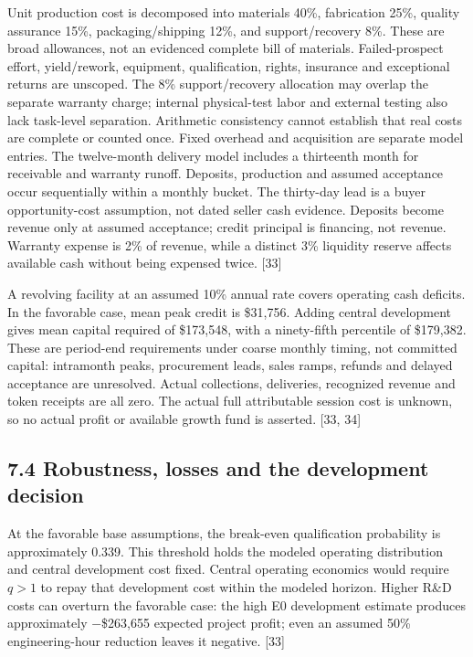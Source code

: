 \documentclass[
  11pt,
]{article}
\begin{document}
Unit production cost is decomposed into materials 40\%, fabrication
25\%, quality assurance 15\%, packaging/shipping 12\%, and
support/recovery 8\%. These are broad allowances, not an evidenced
complete bill of materials. Failed-prospect effort, yield/rework,
equipment, qualification, rights, insurance and exceptional returns are
unscoped. The 8\% support/recovery allocation may overlap the separate
warranty charge; internal physical-test labor and external testing also
lack task-level separation. Arithmetic consistency cannot establish that
real costs are complete or counted once. Fixed overhead and acquisition
are separate model entries. The twelve-month delivery model includes a
thirteenth month for receivable and warranty runoff. Deposits,
production and assumed acceptance occur sequentially within a monthly
bucket. The thirty-day lead is a buyer opportunity-cost assumption, not
dated seller cash evidence. Deposits become revenue only at assumed
acceptance; credit principal is financing, not revenue. Warranty expense
is 2\% of revenue, while a distinct 3\% liquidity reserve affects
available cash without being expensed twice. {[}33{]}

A revolving facility at an assumed 10\% annual rate covers operating
cash deficits. In the favorable case, mean peak credit is \$31,756.
Adding central development gives mean capital required of \$173,548,
with a ninety-fifth percentile of \$179,382. These are period-end
requirements under coarse monthly timing, not committed capital:
intramonth peaks, procurement leads, sales ramps, refunds and delayed
acceptance are unresolved. Actual collections, deliveries, recognized
revenue and token receipts are all zero. The actual full attributable
session cost is unknown, so no actual profit or available growth fund is
asserted. {[}33, 34{]}

\hypertarget{robustness-losses-and-the-development-decision}{%
\subsection{7.4 Robustness, losses and the development
decision}\label{robustness-losses-and-the-development-decision}}

At the favorable base assumptions, the break-even qualification
probability is approximately 0.339. This threshold holds the modeled
operating distribution and central development cost fixed. Central
operating economics would require \(q>1\) to repay that development cost
within the modeled horizon. Higher R\&D costs can overturn the favorable
case: the high E0 development estimate produces approximately −\$263,655
expected project profit; even an assumed 50\% engineering-hour reduction
leaves it negative. {[}33{]}
\end{document}
